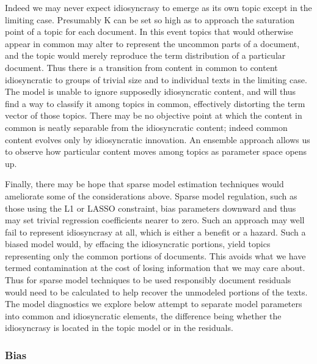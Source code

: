 \documentclass[]{book}
\theoremstyle{definition}
\theoremstyle{definition}
\theoremstyle{definition}
\theoremstyle{remark}
\begin{document}
Indeed we may never expect idiosyncrasy to emerge as its own topic
except in the limiting case. Presumably K can be set so high as to
approach the saturation point of a topic for each document. In this
event topics that would otherwise appear in common may alter to
represent the uncommon parts of a document, and the topic would merely
reproduce the term distribution of a particular document. Thus there is
a transition from content in common to content idiosyncratic to groups
of trivial size and to individual texts in the limiting case. The model
is unable to ignore supposedly idiosyncratic content, and will thus find
a way to classify it among topics in common, effectively distorting the
term vector of those topics. There may be no objective point at which
the content in common is neatly separable from the idiosyncratic
content; indeed common content evolves only by idiosyncratic innovation.
An ensemble approach allows us to observe how particular content moves
among topics as parameter space opens up.

Finally, there may be hope that sparse model estimation techniques would
ameliorate some of the considerations above. Sparse model regulation,
such as those using the L1 or LASSO constraint, bias parameters downward
and thus may set trivial regression coefficients nearer to zero. Such an
approach may well fail to represent idiosyncrasy at all, which is either
a benefit or a hazard. Such a biased model would, by effacing the
idiosyncratic portions, yield topics representing only the common
portions of documents. This avoids what we have termed contamination at
the cost of losing information that we may care about. Thus for sparse
model techniques to be used responsibly document residuals would need to
be calculated to help recover the unmodeled portions of the texts. The
model diagnostics we explore below attempt to separate model parameters
into common and idiosyncratic elements, the difference being whether the
idiosyncrasy is located in the topic model or in the residuals.

\hypertarget{bias}{%
\subsubsection{Bias}\label{bias}}
\end{document}
